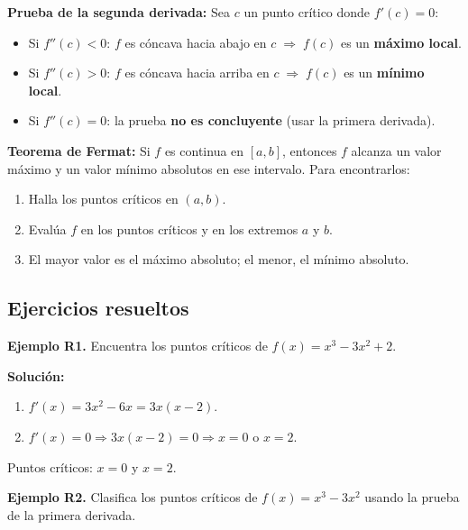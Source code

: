 \documentclass[12pt, a4paper]{article}
\begin{document}
\begin{cuadroextra}
  \textbf{Prueba de la segunda derivada:}
  Sea $c$ un punto crítico donde $f'(c) = 0$:
  \begin{itemize}[leftmargin=*]
    \item Si $f''(c) < 0$: $f$ es cóncava hacia abajo en $c \;\Rightarrow\; f(c)$ es un \textbf{máximo local}.
    \item Si $f''(c) > 0$: $f$ es cóncava hacia arriba en $c \;\Rightarrow\; f(c)$ es un \textbf{mínimo local}.
    \item Si $f''(c) = 0$: la prueba \textbf{no es concluyente} (usar la primera derivada).
  \end{itemize}
\end{cuadroextra}

\newpage

\begin{cuadroadvertencia}
  \textbf{Teorema de Fermat:} Si $f$ es continua en $[a, b]$, entonces $f$ alcanza un valor máximo y un valor mínimo absolutos en ese intervalo. Para encontrarlos:
  \begin{enumerate}
    \item Halla los puntos críticos en $(a, b)$.
    \item Evalúa $f$ en los puntos críticos y en los extremos $a$ y $b$.
    \item El mayor valor es el máximo absoluto; el menor, el mínimo absoluto.
  \end{enumerate}
\end{cuadroadvertencia}

\subsection{Ejercicios resueltos}

\textbf{Ejemplo R1.} Encuentra los puntos críticos de $f(x) = x^3 - 3x^2 + 2$.

\begin{cuadrosolucion}
  \textbf{Solución:}
  \begin{enumerate}
    \item $f'(x) = 3x^2 - 6x = 3x(x - 2)$.
    \item $f'(x) = 0 \Rightarrow 3x(x - 2) = 0 \Rightarrow x = 0$ o $x = 2$.
  \end{enumerate}
  Puntos críticos: $x = 0$ y $x = 2$.
\end{cuadrosolucion}

\textbf{Ejemplo R2.} Clasifica los puntos críticos de $f(x) = x^3 - 3x^2$ usando la prueba de la primera derivada.
\end{document}
